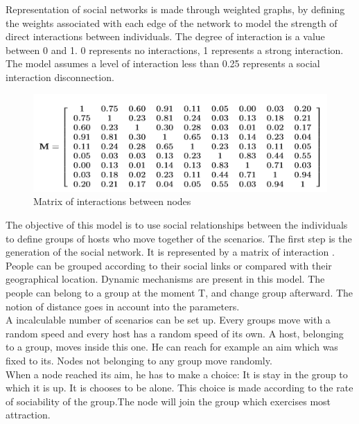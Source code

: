 Representation of social networks is made through weighted graphs, by defining the weights associated with each edge of the network to model the strength of direct interactions between individuals. The degree of interaction is a value between 0 and 1. 0 represents no interactions, 1 represents a strong interaction.
The model assumes a level of interaction less than 0.25 represents a social interaction disconnection.\\


\begin{figure}[h]
\center
\includegraphics{../images/MatrixInteractionSocialNetwork.png}
\caption{\label{MatricSN}Matrix of interactions between nodes}
\label{MatricSN}
\end{figure}

The objective of this model is to use social relationships between the individuals to define groups of hosts who move together of the scenarios.
The first step is the generation of the social network. It is represented by a matrix of interaction \pageref{MatricSN}.\\

People can be grouped according to their social links or compared with their geographical location. Dynamic mechanisms are present in this model. The people can belong to a group at the moment T, and change group afterward. The notion of distance goes in account into the parameters.\\
A incalculable number of scenarios can be set up. Every groups move with a random speed and every host has a random speed of its own. A host, belonging to a group, moves inside this one. He can reach for example an aim which was fixed to its. Nodes not belonging to any group move randomly.\\

When a node reached its aim, he has to make a choice:
It is stay in the group to which it is up.
It is chooses to be alone.
This choice is made according to the rate of sociability of the group.The node will join the group which exercises most attraction.\\

